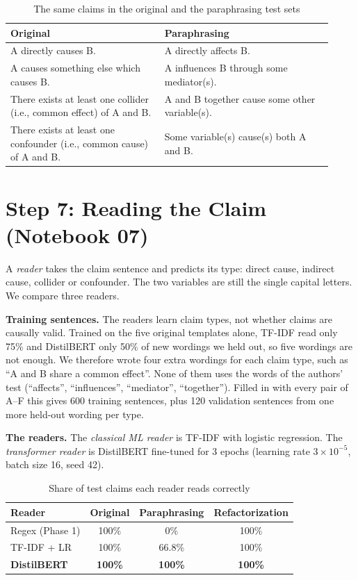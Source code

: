 \documentclass[conference]{IEEEtran}
\begin{document}
\begin{table}[t]
\centering
\caption{The same claims in the original and the paraphrasing test sets}
\label{tab:wordings}
\footnotesize
\setlength{\tabcolsep}{3pt}
\begin{tabular}{p{0.44\linewidth}p{0.48\linewidth}}
\toprule
Original & Paraphrasing \\
\midrule
A directly causes B. & A directly affects B. \\
A causes something else which causes B. & A influences B through some mediator(s). \\
There exists at least one collider (i.e., common effect) of A and B. & A and B together cause some other
variable(s). \\
There exists at least one confounder (i.e., common cause) of A and B. & Some variable(s) cause(s) both A and B. \\
\bottomrule
\end{tabular}
\end{table}

\section{Step 7: Reading the Claim (Notebook 07)}
A \emph{reader} takes the claim sentence and predicts its type: direct cause, indirect cause, collider or
confounder. The two variables are still the single capital letters. We compare three readers.

\textbf{Training sentences.} The readers learn claim types, not whether claims are causally valid. Trained on the five
original templates alone, TF-IDF read only 75\% and DistilBERT only 50\% of new wordings we held out, so five
wordings are not enough. We therefore wrote four extra wordings for each claim type, such as ``A and B share a
common effect''. None of them uses the words of the authors' test (``affects'', ``influences'', ``mediator'',
``together''). Filled in with every pair of A--F this gives 600 training sentences, plus 120 validation
sentences from one more held-out wording per type.

\textbf{The readers.} The \emph{classical ML reader} is TF-IDF with logistic regression. The \emph{transformer
reader} is DistilBERT fine-tuned for 3 epochs (learning rate $3\times10^{-5}$, batch size 16, seed 42).

\begin{table}[t]
\centering
\caption{Share of test claims each reader reads correctly}
\label{tab:readers}
\begin{tabular}{lccc}
\toprule
Reader & Original & Paraphrasing & Refactorization \\
\midrule
Regex (Phase 1) & 100\% & 0\% & 100\% \\
TF-IDF + LR & 100\% & 66.8\% & 100\% \\
\textbf{DistilBERT} & \textbf{100\%} & \textbf{100\%} & \textbf{100\%} \\
\bottomrule
\end{tabular}
\end{table}
\end{document}
